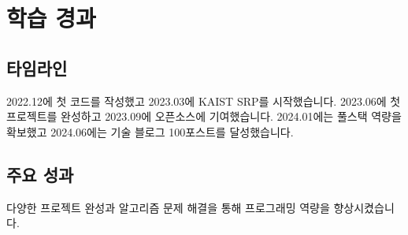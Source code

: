 \section{학습 경과}

\subsection{타임라인}
2022.12에 첫 코드를 작성했고 2023.03에 KAIST SRP를 시작했습니다. 2023.06에 첫 프로젝트를 완성하고 2023.09에 오픈소스에 기여했습니다. 2024.01에는 풀스택 역량을 확보했고 2024.06에는 기술 블로그 100포스트를 달성했습니다.

\subsection{주요 성과}
다양한 프로젝트 완성과 알고리즘 문제 해결을 통해 프로그래밍 역량을 향상시켰습니다.


